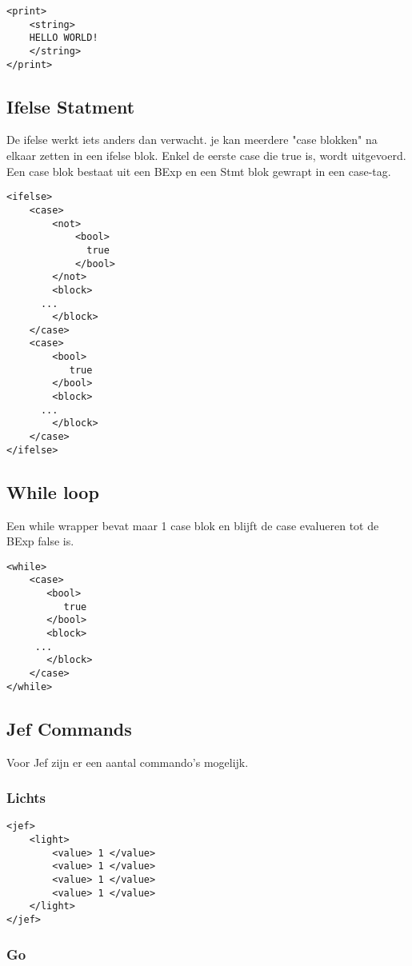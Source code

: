 \documentclass[]{article}
\begin{document}
\begin{lstlisting}
<print>
    <string>
	HELLO WORLD!
    </string>
</print>
\end{lstlisting}

\subsection{Ifelse Statment}
De ifelse werkt iets anders dan verwacht. je kan meerdere "case blokken" na elkaar zetten in een ifelse blok. Enkel de eerste case die true is, wordt uitgevoerd. Een case blok bestaat uit een BExp en een Stmt blok gewrapt in een case-tag.

\begin{lstlisting}
<ifelse>
    <case>
        <not>
            <bool>
              true
            </bool>
        </not>
        <block>
	  ...
        </block>
    </case>
    <case>
        <bool>
           true
        </bool>
        <block>
	  ...
        </block>
    </case>
</ifelse>

\end{lstlisting}


\subsection{While loop}
Een while wrapper bevat maar 1 case blok en blijft de case evalueren tot de BExp false is.
\begin{lstlisting}
<while>
    <case>
       <bool>
          true
       </bool>
       <block>
	 ...
       </block>
    </case>
</while>
\end{lstlisting}

\subsection{Jef Commands}
Voor Jef zijn er een aantal commando's mogelijk.

\subsubsection{Lichts}

\begin{lstlisting}
<jef>
    <light>
        <value> 1 </value>
        <value> 1 </value>
        <value> 1 </value>
        <value> 1 </value>
    </light>
</jef>
\end{lstlisting}

\subsubsection{Go}
\end{document}
